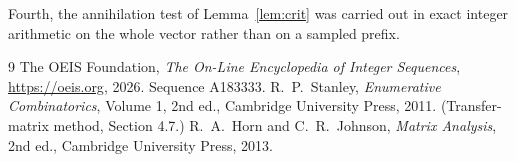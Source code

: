\documentclass[11pt,a4paper]{article}
\theoremstyle{plain}
\theoremstyle{definition}
\begin{document}
Fourth, the annihilation test of Lemma~\ref{lem:crit} was carried out in exact integer
arithmetic on the whole vector rather than on a sampled prefix.

\begin{thebibliography}{9}
 The OEIS Foundation, \emph{The On-Line Encyclopedia of Integer
Sequences}, \url{https://oeis.org}, 2026. Sequence A183333.
 R.~P.~Stanley, \emph{Enumerative Combinatorics}, Volume 1, 2nd ed.,
Cambridge University Press, 2011. (Transfer-matrix method, Section 4.7.)
 R.~A.~Horn and C.~R.~Johnson, \emph{Matrix Analysis}, 2nd ed., Cambridge
University Press, 2013.
\end{thebibliography}
\end{document}

